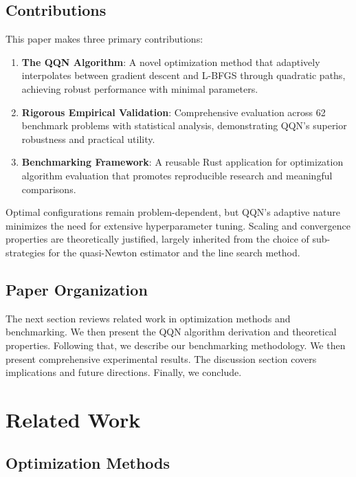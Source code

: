 \hypertarget{contributions}{%
\subsection{Contributions}\label{contributions}}

This paper makes three primary contributions:

\begin{enumerate}
\def\labelenumi{\arabic{enumi}.}
\item
  \textbf{The QQN Algorithm}: A novel optimization method that adaptively interpolates between gradient descent and L-BFGS through quadratic paths, achieving robust performance with minimal parameters.
\item
  \textbf{Rigorous Empirical Validation}: Comprehensive evaluation across 62 benchmark problems with statistical analysis, demonstrating QQN's superior robustness and practical utility.
\item
  \textbf{Benchmarking Framework}: A reusable Rust application for optimization algorithm evaluation that promotes reproducible research and meaningful comparisons.
\end{enumerate}

Optimal configurations remain problem-dependent, but QQN's adaptive nature minimizes the need for extensive hyperparameter tuning.
Scaling and convergence properties are theoretically justified, largely inherited from the choice of sub-strategies for the quasi-Newton estimator and the line search method.

\hypertarget{paper-organization}{%
\subsection{Paper Organization}\label{paper-organization}}

The next section reviews related work in optimization methods and benchmarking.
We then present the QQN algorithm derivation and theoretical properties.
Following that, we describe our benchmarking methodology.
We then present comprehensive experimental results.
The discussion section covers implications and future directions.
Finally, we conclude.

\hypertarget{related-work}{%
\section{Related Work}\label{related-work}}

\hypertarget{optimization-methods}{%
\subsection{Optimization Methods}\label{optimization-methods}}

